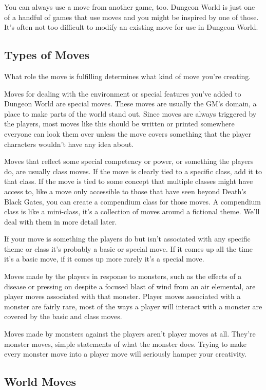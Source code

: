  You can always use a move from another game, too. Dungeon World is just one of a handful of games that use moves and you might be inspired by one of those. It's often not too difficult to modify an existing move for use in Dungeon World.
\subsection{Types of Moves}


 What role the move is fulfilling determines what kind of move you're creating.


 Moves for dealing with the environment or special features you've added to Dungeon World are special moves. These moves are usually the GM's domain, a place to make parts of the world stand out. Since moves are always triggered by the players, most moves like this should be written or printed somewhere everyone can look them over unless the move covers something that the player characters wouldn't have any idea about.


 Moves that reflect some special competency or power, or something the players do, are usually class moves. If the move is clearly tied to a specific class, add it to that class. If the move is tied to some concept that multiple classes might have access to, like a move only accessible to those that have seen beyond Death's Black Gates, you can create a compendium class for those moves. A compendium class is like a mini-class, it's a collection of moves around a fictional theme. We'll deal with them in more detail later.


 If your move is something the players do but isn't associated with any specific theme or class it's probably a basic or special move. If it comes up all the time it's a basic move, if it comes up more rarely it's a special move.


 Moves made by the players in response to monsters, such as the effects of a disease or pressing on despite a focused blast of wind from an air elemental, are player moves associated with that monster. Player moves associated with a monster are fairly rare, most of the ways a player will interact with a monster are covered by the basic and class moves.


 Moves made by monsters against the players aren't player moves at all. They're monster moves, simple statements of what the monster does. Trying to make every monster move into a player move will seriously hamper your creativity.
\subsection{World Moves}


